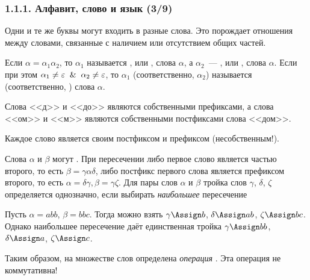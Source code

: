 \begin{frame}
\frametitle{1.1.1. Алфавит, слово и язык (3/9)}

Одни и те же буквы могут входить в разные слова.
Это порождает отношения между словами, 
связанные с наличием или отсутствием общих частей. 

Если $\alpha=\alpha_1\alpha_2$, то $\alpha_1$ называется
, или ,
слова $\alpha$, а $\alpha_2$~---
, или
, слова $\alpha$.
Если при этом $\alpha_1 \neq \varepsilon\And \alpha_2\neq\varepsilon$, то
$\alpha_1$ (соответственно, $\alpha_2$)
называется 
(соответственно, )
слова $\alpha$.

\begin{example}
Слова <<д>> и <<до>> являются собственными префиксами, а слова <<ом>> и <<м>> являются собственными постфиксами слова <<дом>>.
\end{example}

\begin{remark}
Каждое слово является своим постфиксом и префиксом (несобственным!).
\end{remark}

\medskip
Слова $\alpha$ и $\beta$ могут .
При пересечении либо первое слово является частью второго, 
то есть $\beta=\gamma\alpha\delta$,
либо постфикс первого слова является префиксом второго, 
то есть $\alpha=\delta\gamma, \beta=\gamma\zeta$.
Для пары слов $\alpha$ и $\beta$ тройка слов 
$\gamma$, $\delta$, $\zeta$ определяется однозначно,
если выбирать {\em наибольшее} пересечение

\begin{example}
Пусть $\alpha=abb$, $\beta=bbc$. Тогда можно
взять $\gamma\Assign b$, $\delta\Assign ab$, $\zeta\Assign bc$.
Однако наибольшее пересечение даёт единственная тройка 
$\gamma\Assign bb$, $\delta\Assign a$, $\zeta\Assign c$.
\end{example} 

Таким образом, на множестве слов определена
{\em операция} . 
Эта операция не коммутативна! 
\end{frame}


